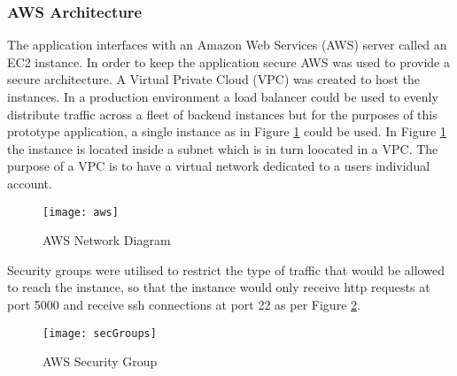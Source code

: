 \subsubsection*{AWS Architecture}
The application interfaces with an Amazon Web Services (AWS) server called an EC2 instance.
In order to keep the application secure AWS was used to provide a secure architecture.
A Virtual Private Cloud (VPC) was created to host the instances.
In a production environment a load balancer could be used to evenly distribute traffic across a fleet of backend instances but for the purposes of this prototype application, a single instance as in Figure \ref{fig:aws} could be used.
In Figure \ref{fig:aws} the instance is located inside a subnet which is in turn loocated in a VPC.
The purpose of a VPC is to have a virtual network dedicated to a users individual account. 
\begin{figure}[h]
    \centering
    \texttt{[image: aws]}
    \caption{AWS Network Diagram}
    \label{fig:aws}
\end{figure}

Security groups were utilised to restrict the type of traffic that would be allowed to reach the instance, so that the instance would only receive http requests at port 5000 and receive ssh connections at port 22 as per Figure \ref{fig:awsSecGroup}.
\begin{figure}[h]
    \centering
    \texttt{[image: secGroups]}
    \caption{AWS Security Group}
    \label{fig:awsSecGroup}
\end{figure}

